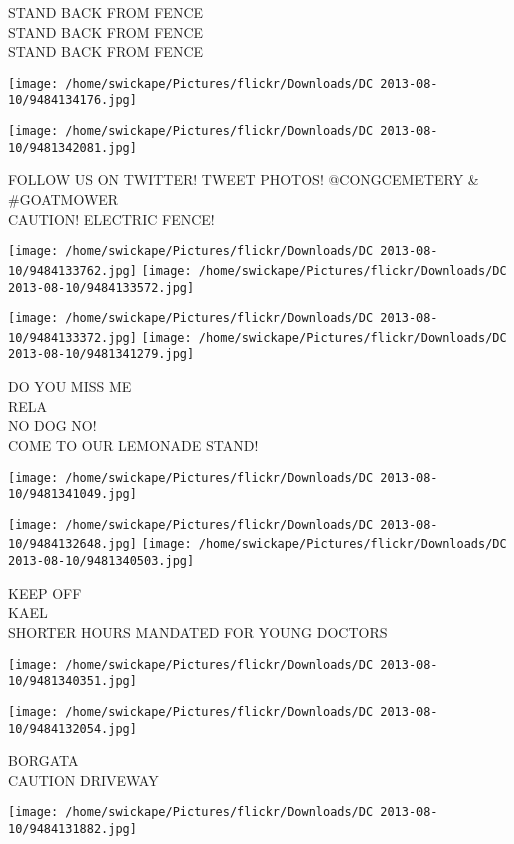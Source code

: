 \documentclass[10pt,letterpaper]{article}
\begin{document}
STAND BACK FROM FENCE\\
STAND BACK FROM FENCE\\
STAND BACK FROM FENCE
\pagebreak

\texttt{[image: /home/swickape/Pictures/flickr/Downloads/DC 2013-08-10/9484134176.jpg]}

\vspace{0.25in}
\texttt{[image: /home/swickape/Pictures/flickr/Downloads/DC 2013-08-10/9481342081.jpg]}

FOLLOW US ON TWITTER!  TWEET PHOTOS! @CONGCEMETERY \& \#GOATMOWER\\
CAUTION!  ELECTRIC FENCE!
\pagebreak

\texttt{[image: /home/swickape/Pictures/flickr/Downloads/DC 2013-08-10/9484133762.jpg]}
\texttt{[image: /home/swickape/Pictures/flickr/Downloads/DC 2013-08-10/9484133572.jpg]}

\texttt{[image: /home/swickape/Pictures/flickr/Downloads/DC 2013-08-10/9484133372.jpg]}
\texttt{[image: /home/swickape/Pictures/flickr/Downloads/DC 2013-08-10/9481341279.jpg]}

DO YOU MISS ME\\
RELA\\
NO DOG NO!\\
COME TO OUR LEMONADE STAND!
\pagebreak

\texttt{[image: /home/swickape/Pictures/flickr/Downloads/DC 2013-08-10/9481341049.jpg]}

\vspace{0.25in}
\texttt{[image: /home/swickape/Pictures/flickr/Downloads/DC 2013-08-10/9484132648.jpg]}
\texttt{[image: /home/swickape/Pictures/flickr/Downloads/DC 2013-08-10/9481340503.jpg]}

KEEP OFF\\
KAEL\\
SHORTER HOURS MANDATED FOR YOUNG DOCTORS
\pagebreak

\texttt{[image: /home/swickape/Pictures/flickr/Downloads/DC 2013-08-10/9481340351.jpg]}

\vspace{0.25in}
\texttt{[image: /home/swickape/Pictures/flickr/Downloads/DC 2013-08-10/9484132054.jpg]}

BORGATA\\
CAUTION DRIVEWAY
\pagebreak

\texttt{[image: /home/swickape/Pictures/flickr/Downloads/DC 2013-08-10/9484131882.jpg]}
\end{document}

